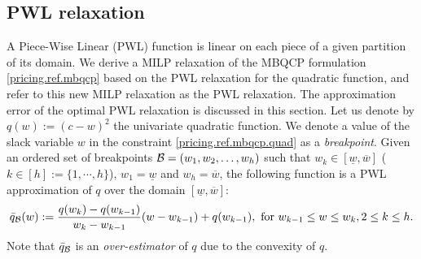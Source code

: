 \begin{comment}
\textbf{Solution method for the MBQCP formulation} The continuous relaxation of the MBQCP formulation \eqref{pricing.ref.mbqcp} is not convex. Most MINLP solvers use the spatial branch-and-bound algorithm to solve it, see \cite{berthold2012extending}. The spatial branch-and-bound algorithm is a special  branch-and-bound method that uses the McCormick envelope of quadratic terms \citep{mccormick1976computability}. The McCormick overestimator \citep{mccormick1976computability} of $(c-w)^2$ is $c^2 - cw$, i.e., $(c-w)^2 \le c^2 - cw$ for $w \in [0,c]$. The concave quadratic constraint \eqref{pricing.ref.mbqcp.quad} is relaxed by replacing the term $(c-w)^2$ with its overestimator $c^2 - cw$. The binary variables $x$ are fixed with high priority, and spatial branching later divides the domain of $w$ ($[0,c]$) into two subdomains $[0, c']$ and $[c',c]$. In general, it may require infinitely many spatial branches to model the continuous relaxation of the MBQCP formulation.

\end{comment}

\subsection{PWL relaxation}
\label{sec.pwlrel}
A Piece-Wise Linear (PWL) function is linear on each piece of a given partition of its domain. We derive a MILP relaxation of the MBQCP formulation \eqref{pricing.ref.mbqcp} based on the PWL relaxation for the quadratic function, and refer to this new MILP relaxation as the PWL relaxation. The approximation error of the optimal PWL relaxation is discussed in this section. Let us denote by \(q(w):=(c-w)^2\) the univariate quadratic function. We denote a value of the slack variable \(w\) in the constraint \eqref{pricing.ref.mbqcp.quad} as a \textit{breakpoint}. Given an ordered set of breakpoints \(\mathcal B = (w_1, w_2,\hdots, w_h)\) such that \(w_k \in [\underline{w},\overline{w}]\) ($k \in [h]:=\{1,\cdots,h\}$), $w_1 = \underline{w}$ and $w_h = \overline{w}$, the following function is a PWL approximation of \(q\) over the domain \([\underline{w},\overline{w}]\):
\begin{equation*}
   \bar{q}_{\mathcal B}(w):=
   	 \frac{q(w_k)-q(w_{k-1})}{w_{k}-w_{k-1}}(w-w_{k-1}) + q(w_{k-1}), \textup{ for } w_{k-1}\leq w\leq w_{k}, 2 \le k \le h.
\end{equation*}
Note that $ \bar{q}_{\mathcal B}$ is  an \textit{over-estimator} of  $q$ due to the convexity of $q$.

